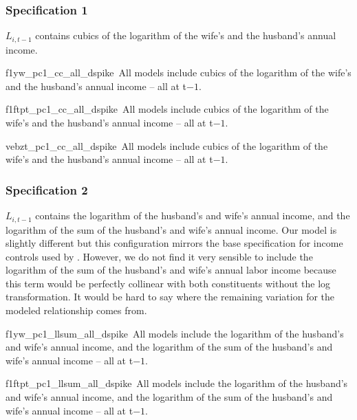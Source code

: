 \documentclass[a4paper,11pt]{scrartcl}
\begin{document}
\begin{appendix}
		\renewcommand{\samplenote}{}


		\subsubsection{Specification 1}

		$L_{i,t-1}$ contains cubics of the logarithm of the wife's and the husband's annual income.

		\renewcommand{\specnote}{All models include cubics of the logarithm of the wife's and the husband's annual income -- all at t$-1$.}

		{f1yw_pc1_cc_all_dspike}%
		{\samplenote\,\specnote}

		{f1ftpt_pc1_cc_all_dspike}%
		{\samplenote\,\specnote}

		{vebzt_pc1_cc_all_dspike}%
		{\samplenote\,\specnote}


		\subsubsection{Specification 2}

		$L_{i,t-1}$ contains the logarithm of the husband's and wife's annual income, and the logarithm of the sum of the husband's and wife's annual income. Our model is slightly different but this configuration mirrors the base specification for income controls used by \cite[p. 611]{bertrand2015gender}. However, we do not find it very sensible to include the logarithm of the sum of the husband's and wife's annual labor income because this term would be perfectly collinear with both constituents without the log transformation. It would be hard to say where the remaining variation for the modeled relationship comes from.

		\renewcommand{\specnote}{All models include the logarithm of the husband's and wife's annual income, and the logarithm of the sum of the husband's and wife's annual income -- all at t$-1$.}

		{f1yw_pc1_llsum_all_dspike}%
		{\samplenote\,\specnote}

		{f1ftpt_pc1_llsum_all_dspike}%
		{\samplenote\,\specnote}


\end{appendix}
\end{document}
